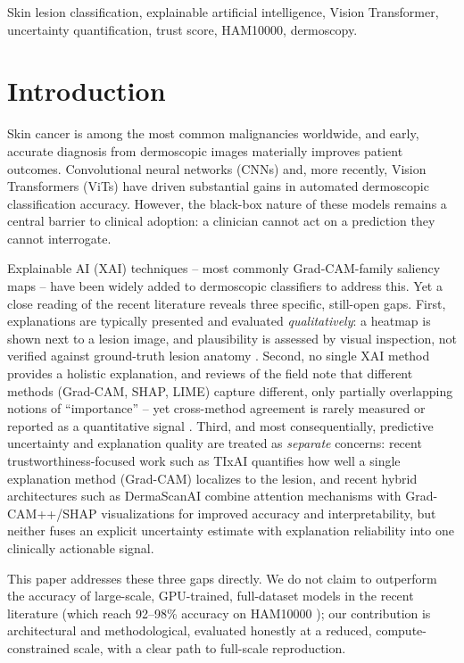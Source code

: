 \documentclass[conference]{IEEEtran}
\begin{document}
\begin{IEEEkeywords}
Skin lesion classification, explainable artificial intelligence, Vision Transformer,
uncertainty quantification, trust score, HAM10000, dermoscopy.
\end{IEEEkeywords}

\section{Introduction}

Skin cancer is among the most common malignancies worldwide, and early, accurate diagnosis
from dermoscopic images materially improves patient outcomes. Convolutional neural networks
(CNNs) and, more recently, Vision Transformers (ViTs) \cite{dosovitskiy2021} have driven
substantial gains in automated dermoscopic classification accuracy. However, the black-box
nature of these models remains a central barrier to clinical adoption: a clinician cannot
act on a prediction they cannot interrogate.

Explainable AI (XAI) techniques -- most commonly Grad-CAM-family saliency maps -- have been
widely added to dermoscopic classifiers to address this. Yet a close reading of the recent
literature reveals three specific, still-open gaps. First, explanations are typically
presented and evaluated \emph{qualitatively}: a heatmap is shown next to a lesion image, and
plausibility is assessed by visual inspection, not verified against ground-truth lesion
anatomy \cite{munjal2024,murali2026}. Second, no single XAI method provides a holistic
explanation, and reviews of the field note that different methods (Grad-CAM, SHAP, LIME)
capture different, only partially overlapping notions of ``importance'' -- yet cross-method
agreement is rarely measured or reported as a quantitative signal \cite{munjal2024}. Third,
and most consequentially, predictive uncertainty and explanation quality are treated as
\emph{separate} concerns: recent trustworthiness-focused work such as TIxAI
\cite{ieracitano2025} quantifies how well a single explanation method (Grad-CAM) localizes
to the lesion, and recent hybrid architectures such as DermaScanAI \cite{murali2026} combine
attention mechanisms with Grad-CAM++/SHAP visualizations for improved accuracy and
interpretability, but neither fuses an explicit uncertainty estimate with explanation
reliability into one clinically actionable signal.

This paper addresses these three gaps directly. We do not claim to outperform the accuracy
of large-scale, GPU-trained, full-dataset models in the recent literature (which reach
92--98\% accuracy on HAM10000 \cite{nie2022,murali2026}); our contribution is architectural
and methodological, evaluated honestly at a reduced, compute-constrained scale, with a clear
path to full-scale reproduction.
\end{document}
